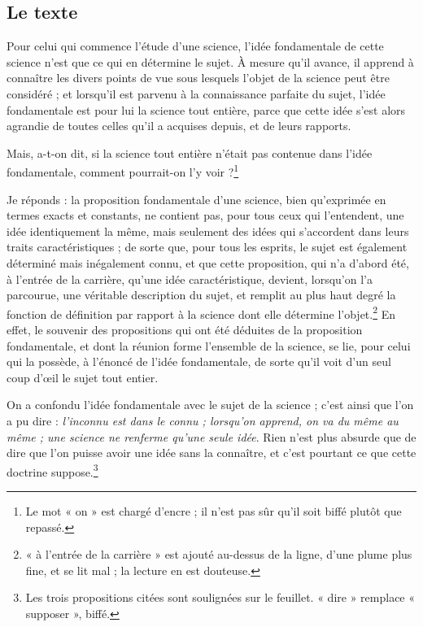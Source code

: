\documentclass[11pt,a4paper]{article}
\begin{document}
\subsection*{Le texte}

Pour celui qui commence l'étude d'une science, l'idée fondamentale de cette
science n'est que ce qui en détermine le sujet. À mesure qu'il avance, il
apprend à connaître les divers points de vue sous lesquels l'objet de la
science peut être considéré ; et lorsqu'il est parvenu à la connaissance
parfaite du sujet, l'idée fondamentale est pour lui la science tout entière,
parce que cette idée s'est alors agrandie de toutes celles qu'il a acquises
depuis, et de leurs rapports.

Mais, a-t-on dit, si la science tout entière n'était pas contenue dans l'idée
fondamentale, comment pourrait-on l'y voir ?\footnote{Le mot « on » est
chargé d'encre ; il n'est pas sûr qu'il soit biffé plutôt que repassé.}

Je réponds : la proposition fondamentale d'une science, bien qu'exprimée en
termes exacts et constants, ne contient pas, pour tous ceux qui l'entendent,
une idée identiquement la même, mais seulement des idées qui s'accordent dans
leurs traits caractéristiques ; de sorte que, pour tous les esprits, le sujet
est également déterminé mais inégalement connu, et que cette proposition, qui
n'a d'abord été, à l'entrée de la carrière, qu'une idée caractéristique,
devient, lorsqu'on l'a parcourue, une véritable description du sujet, et
remplit au plus haut degré la fonction de définition par rapport à la science
dont elle détermine l'objet.\footnote{« à l'entrée de la carrière » est
ajouté au-dessus de la ligne, d'une plume plus fine, et se lit mal ; la
lecture en est douteuse.} En effet, le souvenir des propositions qui ont été
déduites de la proposition fondamentale, et dont la réunion forme l'ensemble
de la science, se lie, pour celui qui la possède, à l'énoncé de l'idée
fondamentale, de sorte qu'il voit d'un seul coup d'œil le sujet tout entier.

On a confondu l'idée fondamentale avec le sujet de la science ; c'est ainsi
que l'on a pu dire : \emph{l'inconnu est dans le connu ; lorsqu'on apprend,
on va du même au même ; une science ne renferme qu'une seule idée}. Rien
n'est plus absurde que de dire que l'on puisse avoir une idée sans la
connaître, et c'est pourtant ce que cette doctrine suppose.\footnote{Les
trois propositions citées sont soulignées sur le feuillet. « dire » remplace
« supposer », biffé.}
\end{document}
